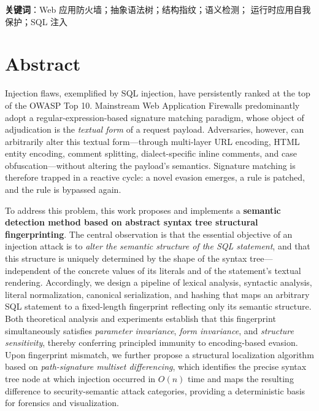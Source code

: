 \vspace{1.2em}
\noindent\textbf{关键词}：\quad Web 应用防火墙；抽象语法树；结构指纹；语义检测；
运行时应用自我保护；SQL 注入

\vspace{2.2em}

{}
\section*{Abstract}

Injection flaws, exemplified by SQL injection, have persistently ranked at the top
of the OWASP Top 10. Mainstream Web Application Firewalls predominantly adopt a
regular-expression-based signature matching paradigm, whose object of adjudication
is the \emph{textual form} of a request payload. Adversaries, however, can
arbitrarily alter this textual form---through multi-layer URL encoding, HTML entity
encoding, comment splitting, dialect-specific inline comments, and case
obfuscation---without altering the payload's semantics. Signature matching is
therefore trapped in a reactive cycle: a novel evasion emerges, a rule is patched,
and the rule is bypassed again.

To address this problem, this work proposes and implements a \textbf{semantic
detection method based on abstract syntax tree structural fingerprinting}. The
central observation is that the essential objective of an injection attack is to
\emph{alter the semantic structure of the SQL statement}, and that this structure
is uniquely determined by the shape of the syntax tree---independent of the
concrete values of its literals and of the statement's textual rendering.
Accordingly, we design a pipeline of lexical analysis, syntactic analysis, literal
normalization, canonical serialization, and hashing that maps an arbitrary SQL
statement to a fixed-length fingerprint reflecting only its semantic structure.
Both theoretical analysis and experiments establish that this fingerprint
simultaneously satisfies \emph{parameter invariance}, \emph{form invariance}, and
\emph{structure sensitivity}, thereby conferring principled immunity to
encoding-based evasion. Upon fingerprint mismatch, we further propose a structural
localization algorithm based on \emph{path-signature multiset differencing}, which
identifies the precise syntax tree node at which injection occurred in $O(n)$ time
and maps the resulting difference to security-semantic attack categories, providing
a deterministic basis for forensics and visualization.

